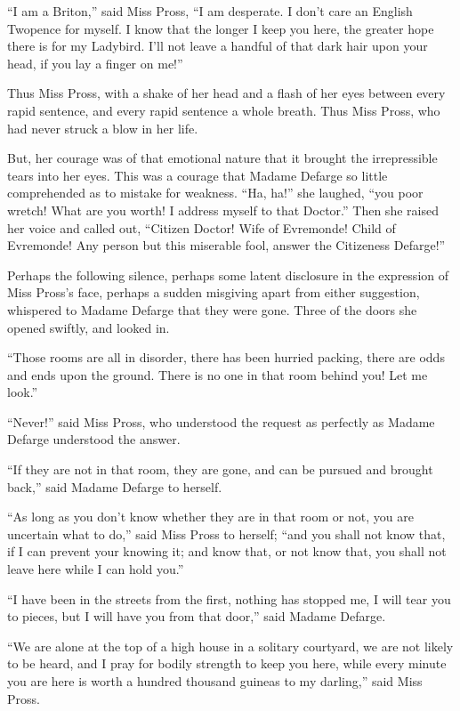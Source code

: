 ``I am a Briton,'' said Miss Pross, ``I am desperate.  I don't care an
English Twopence for myself.  I know that the longer I keep you here,
the greater hope there is for my Ladybird.  I'll not leave a handful
of that dark hair upon your head, if you lay a finger on me!''

Thus Miss Pross, with a shake of her head and a flash of her eyes
between every rapid sentence, and every rapid sentence a whole breath.
Thus Miss Pross, who had never struck a blow in her life.

But, her courage was of that emotional nature that it brought the
irrepressible tears into her eyes.  This was a courage that Madame
Defarge so little comprehended as to mistake for weakness.  ``Ha, ha!''
she laughed, ``you poor wretch!  What are you worth!  I address myself
to that Doctor.''  Then she raised her voice and called out, ``Citizen
Doctor!  Wife of Evremonde!  Child of Evremonde!  Any person but this
miserable fool, answer the Citizeness Defarge!''

Perhaps the following silence, perhaps some latent disclosure in the
expression of Miss Pross's face, perhaps a sudden misgiving apart from
either suggestion, whispered to Madame Defarge that they were gone.
Three of the doors she opened swiftly, and looked in.

``Those rooms are all in disorder, there has been hurried packing,
there are odds and ends upon the ground.  There is no one in that
room behind you!  Let me look.''

``Never!'' said Miss Pross, who understood the request as perfectly as
Madame Defarge understood the answer.

``If they are not in that room, they are gone, and can be pursued and
brought back,'' said Madame Defarge to herself.

``As long as you don't know whether they are in that room or not, you
are uncertain what to do,'' said Miss Pross to herself; ``and you shall
not know that, if I can prevent your knowing it; and know that, or
not know that, you shall not leave here while I can hold you.''

``I have been in the streets from the first, nothing has stopped me,
I will tear you to pieces, but I will have you from that door,'' said
Madame Defarge.

``We are alone at the top of a high house in a solitary courtyard,
we are not likely to be heard, and I pray for bodily strength to keep
you here, while every minute you are here is worth a hundred thousand
guineas to my darling,'' said Miss Pross.

